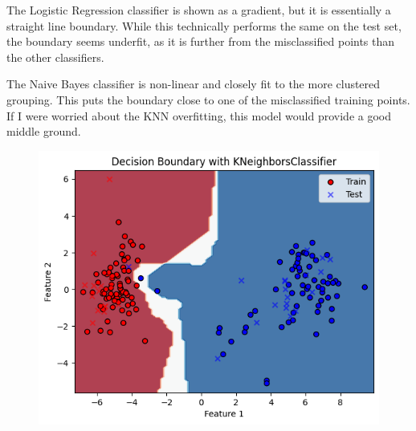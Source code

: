 \documentclass[12pt]{article}
\begin{document}
\begin{enumerate}
    The Logistic Regression classifier is shown as a gradient, but it is essentially a straight line boundary. While this technically performs the same on the test set, the boundary seems underfit, as it is further from the misclassified points than the other classifiers.

    The Naive Bayes classifier is non-linear and closely fit to the more clustered grouping. This puts the boundary close to one of the misclassified training points. If I were worried about the KNN overfitting, this model would provide a good middle ground.

	\begin{figure}[H]
        \centering
        \includegraphics[width=\textwidth]{images/knn_graph.png}
    \end{figure}


\end{enumerate}
\end{document}
